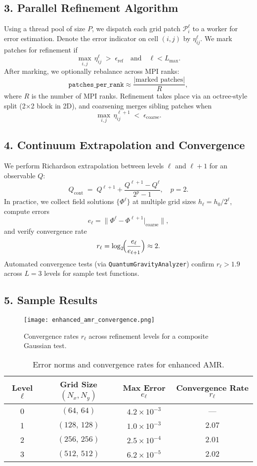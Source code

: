 \documentclass[12pt]{article}
\begin{document}
\subsection*{3. Parallel Refinement Algorithm}
Using a thread pool of size $P$, we dispatch each grid patch $\mathcal{P}_i^\ell$ to a worker for error estimation.  Denote the error indicator on cell $(i,j)$ by $\eta_{ij}^\ell$.  We mark patches for refinement if
\[
  \max_{i,j}\,\eta_{ij}^\ell \;>\; \epsilon_\text{ref} \quad \text{and} \quad \ell < L_{\max}.
\]
After marking, we optionally rebalance across MPI ranks:
\[
  \texttt{patches\_per\_rank} \approx \frac{|\text{marked patches}|}{R},
\]
where $R$ is the number of MPI ranks.  Refinement takes place via an octree‐style split (2×2 block in 2D), and coarsening merges sibling patches when
\[
  \max_{i,j}\,\eta_{ij}^{\ell+1} \;<\; \epsilon_\text{coarse}.
\]

\subsection*{4. Continuum Extrapolation and Convergence}
We perform Richardson extrapolation between levels $\ell$ and $\ell+1$ for an observable $Q$:
\[
  Q_\text{cont} \;=\; Q^{\ell+1} + \frac{Q^{\ell+1} - Q^\ell}{2^p - 1}, 
  \quad p=2.
\]
In practice, we collect field solutions $\{\Phi^\ell\}$ at multiple grid sizes $h_\ell = h_0/2^\ell$, compute errors 
\[
  e_\ell = \|\Phi^\ell - \Phi^{\ell+1}|_{\text{coarse}}\|,
\]
and verify convergence rate
\[
  r_\ell = \log_2\!\Bigl(\frac{e_\ell}{e_{\ell+1}}\Bigr) \approx 2.
\]
Automated convergence tests (via \texttt{QuantumGravityAnalyzer}) confirm $r_\ell > 1.9$ across $L=3$ levels for sample test functions.

\subsection*{5. Sample Results}
\begin{figure}[h]
  \centering
  \texttt{[image: enhanced\_amr\_convergence.png]}
  \caption{Convergence rates $r_\ell$ across refinement levels for a composite Gaussian test.}
\end{figure}

\begin{table}[h]
  \centering
  \begin{tabular}{c c c c}
    \hline
    Level $\ell$ & Grid Size $(N_x,N_y)$ & Max Error $e_\ell$ & Convergence Rate $r_\ell$ \\
    \hline
    0 & $(64,\,64)$   & $4.2\times10^{-3}$ & — \\
    1 & $(128,\,128)$ & $1.0\times10^{-3}$ & $2.07$ \\
    2 & $(256,\,256)$ & $2.5\times10^{-4}$ & $2.01$ \\
    3 & $(512,\,512)$ & $6.2\times10^{-5}$ & $2.02$ \\
    \hline
  \end{tabular}
  \caption{Error norms and convergence rates for enhanced AMR.}
\end{table}
\end{document}
